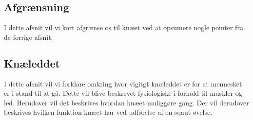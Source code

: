 \subsection{Afgrænsning}
I dette afsnit vil vi kort afgrænse os til knæet ved at opsumere nogle pointer fra de forrige afsnit.

\subsection{Knæleddet}
I dette afsnit vil vi forklare omkring hvor vigitgt knæleddet er for at mennesket er i stand til at gå. Dette vil blive beskrevet fysiologiske i forhold til muskler og led. Herudover vil det beskrives hvordan knæet muliggøre gang. Der vil derudover beskrives hvilken funktion knæet har ved udførelse af en sqaut øvelse.
